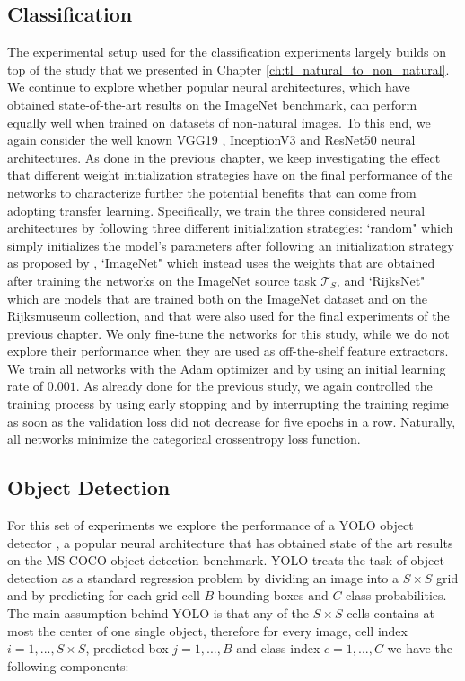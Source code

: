 \subsection{Classification}
The experimental setup used for the classification experiments largely builds on top of the study that we presented in Chapter \ref{ch:tl_natural_to_non_natural}. We continue to explore whether popular neural architectures, which have obtained state-of-the-art results on the ImageNet benchmark, can perform equally well when trained on datasets of non-natural images. To this end, we again consider the well known VGG19 \cite{simonyan2014very}, InceptionV3 \cite{szegedy2016rethinking} and ResNet50 \cite{xie2017aggregated} neural architectures. As done in the previous chapter, we keep investigating the effect that different weight initialization strategies have on the final performance of the networks to characterize further the potential benefits that can come from adopting transfer learning. Specifically, we train the three considered neural architectures by following three different initialization strategies: `random" which simply initializes the model's parameters after following an initialization strategy as proposed by \citet{he2015delving}, `ImageNet" which instead uses the weights that are obtained after training the networks on the ImageNet source task $\mathcal{T}_S$, and `RijksNet" which are models that are trained both on the ImageNet dataset and on the Rijksmuseum collection, and that were also used for the final experiments of the previous chapter. We only fine-tune the networks for this study, while we do not explore their performance when they are used as off-the-shelf feature extractors. We train all networks with the Adam optimizer \cite{kingma2014adam} and by using an initial learning rate of $0.001$. As already done for the previous study, we again controlled the training process by using early stopping and by interrupting the training regime as soon as the validation loss did not decrease for five epochs in a row. Naturally, all networks minimize the categorical crossentropy loss function.

\subsection{Object Detection}
\label{sec:object_detection_exp}

For this set of experiments we explore the performance of a YOLO object detector \cite{redmon2017yolo9000}, a popular neural architecture that has obtained state of the art results on the MS-COCO object detection benchmark. YOLO treats the task of object detection as a standard regression problem by dividing an image into a $S\times S$ grid and by predicting for each grid cell $B$ bounding boxes and $C$ class probabilities. The main assumption behind YOLO is that any of the $S\times S$ cells contains at most the center of one single object, therefore for every image, cell index $i=1,...,S\times S$, predicted box $j=1,...,B$ and class index $c=1,...,C$ we have the following components: 

